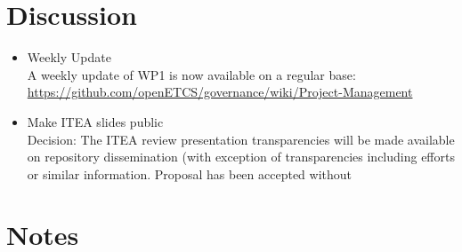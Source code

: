 \documentclass[a4paper, 11pt]{article}
\begin{document}
\section{Discussion}
\begin{itemize}
\item Weekly Update\\
A weekly update of WP1 is now available on a regular base: \url{https://github.com/openETCS/governance/wiki/Project-Management}

\item Make ITEA slides public\\
Decision: The ITEA review presentation transparencies will be made available on repository dissemination (with exception of transparencies including efforts or similar information. Proposal has been accepted without 


\end{itemize}

\section{Notes}
\end{document}
